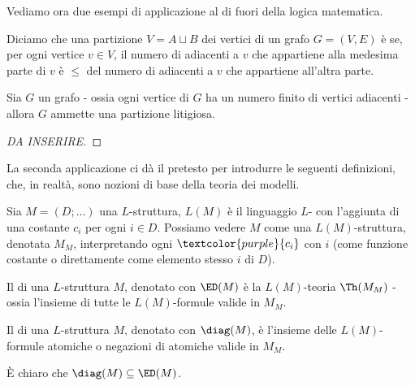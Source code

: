 Vediamo ora due esempi di applicazione al di fuori della logica matematica.

\begin{definition}
    Diciamo che una partizione $V = A \sqcup B$ dei vertici di un grafo $G = (V,E)$ è  se, per ogni vertice $v \in V$,
    il numero di adiacenti a $v$ che appartiene alla medesima parte di $v$ è $\leq$ del numero di adiacenti a $v$ che appartiene all'altra parte.
\end{definition}

\begin{proposition}
    Sia $G$ un grafo  - ossia ogni vertice di $G$ ha un numero finito di vertici adiacenti - allora $G$ ammette una partizione litigiosa.
\end{proposition}

\begin{proof}
    [DA INSERIRE]
\end{proof}

La seconda applicazione ci dà il pretesto per introdurre le seguenti definizioni, che, in realtà, sono nozioni di base della teoria dei modelli.

\begin{definition}
    Sia $M = (D;\ldots)$ una $L$-struttura, $L(M)$ è il linguaggio $L$- con l'aggiunta di una costante $c_i$ per ogni $i \in D$. 
    Possiamo vedere $M$ come una $L(M)$-struttura, denotata $M_M$, interpretando ogni $\textcolor{purple}{c_i}$ con $i$ (come funzione costante o direttamente come elemento stesso $i$ di $D$).
\end{definition}

\begin{definition}
    Il  di una $L$-struttura $M$, denotato con $\ED(M)$ è la $L(M)$-teoria $\Th(M_M)$ - ossia l'insieme di tutte le $L(M)$-formule valide in $M_M$.
\end{definition}

\begin{definition}
    Il  di una $L$-struttura $M$, denotato con $\diag(M)$, è l'insieme delle $L(M)$-formule atomiche o negazioni di atomiche valide in $M_M$.
\end{definition}

\begin{remark}
    È chiaro che $\diag(M) \subseteq \ED(M)$.
\end{remark}

